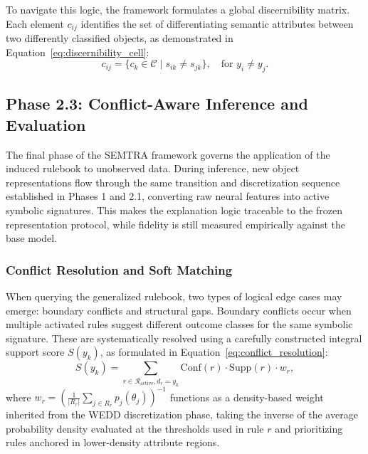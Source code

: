 \documentclass[make,article,submit,pdftex,moreauthors]{Definitions/mdpi}
\newcommand{\C}{\mathcal{C}}
\newcommand{\Rule}{\mathcal{R}}
\begin{document}
To navigate this logic, the framework formulates a global discernibility matrix. Each element $c_{ij}$ identifies the set of differentiating semantic attributes between two differently classified objects, as demonstrated in Equation~\eqref{eq:discernibility_cell}:
\begin{equation}
 \label{eq:discernibility_cell}
 c_{ij} = \{c_k \in \C \mid s_{ik} \neq s_{jk}\}, \quad \text{for } y_i \neq y_j.
\end{equation}

\subsection{Phase 2.3: Conflict-Aware Inference and Evaluation}
\label{subsec:inference_fidelity_metrics}

The final phase of the SEMTRA framework governs the application of the induced rulebook to unobserved data. During inference, new object representations flow through the same transition and discretization sequence established in Phases 1 and 2.1, converting raw neural features into active symbolic signatures. This makes the explanation logic traceable to the frozen representation protocol, while fidelity is still measured empirically against the base model.

\subsubsection{Conflict Resolution and Soft Matching}

When querying the generalized rulebook, two types of logical edge cases may emerge: boundary conflicts and structural gaps. Boundary conflicts occur when multiple activated rules suggest different outcome classes for the same symbolic signature. These are systematically resolved using a carefully constructed integral support score $S(y_k)$, as formulated in Equation~\eqref{eq:conflict_resolution}:
\begin{equation}
 \label{eq:conflict_resolution}
 S(y_k) = \sum_{r \in \Rule_{\text{active}}, d_r=y_k} \mathrm{Conf}(r) \cdot \mathrm{Supp}(r) \cdot w_r,
\end{equation}
where $w_r = \left( \frac{1}{|R_r|} \sum_{j \in R_r} p_j(\theta_{j}) \right)^{-1}$ functions as a density-based weight inherited from the WEDD discretization phase, taking the inverse of the average probability density evaluated at the thresholds used in rule $r$ and prioritizing rules anchored in lower-density attribute regions.
\end{document}
